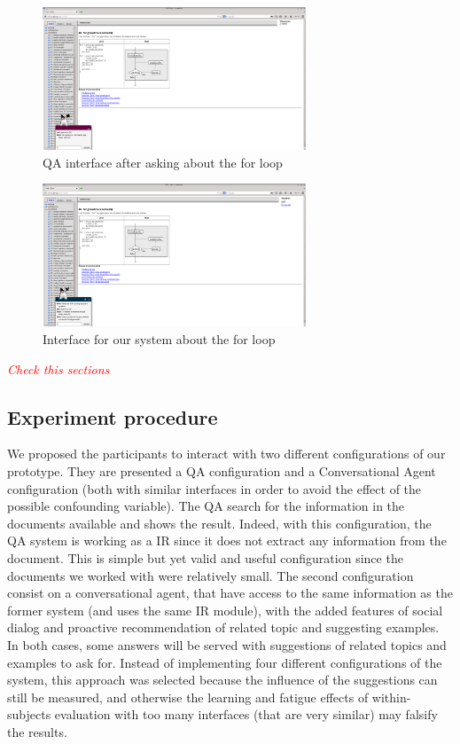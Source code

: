\begin{figure}[!htbp]
    \centering
    \includegraphics[width=0.7\textwidth]{img/test/qa-client2.png}
    \caption{QA interface after asking about the for loop}
    \label{fig:qa-client-for}
\end{figure}

\begin{figure}[!htbp]
    \centering
    \includegraphics[width=0.7\textwidth]{img/test/ask-client.png}
    \caption{Interface for our system about the for loop}
    \label{fig:ask-client-for}
\end{figure}

\emph{\textcolor{red}{Check this sections}}

\subsection{Experiment procedure}


We proposed the participants to interact with two different configurations of our prototype. They are presented a \ac{QA} configuration and a Conversational Agent configuration (both with similar interfaces in order to avoid the effect of the possible confounding variable). The \ac{QA} search for the information in the documents available and shows the result. Indeed, with this configuration, the \ac{QA} system is working as a \ac{IR} since it does not extract any information from the document. This is simple but yet valid and useful configuration since the documents we worked with were relatively small. The second configuration consist on a conversational agent, that have access to the same information as the former system (and uses the same \ac{IR} module), with the added features of social dialog and proactive recommendation of related topic and suggesting examples. In both cases, some answers will be served with suggestions of related topics and examples to ask for. Instead of implementing four different configurations of the system, this approach was selected because the influence of the suggestions can still be measured, and otherwise the learning and fatigue effects of within-subjects evaluation with too many interfaces (that are very similar) may falsify the results.


